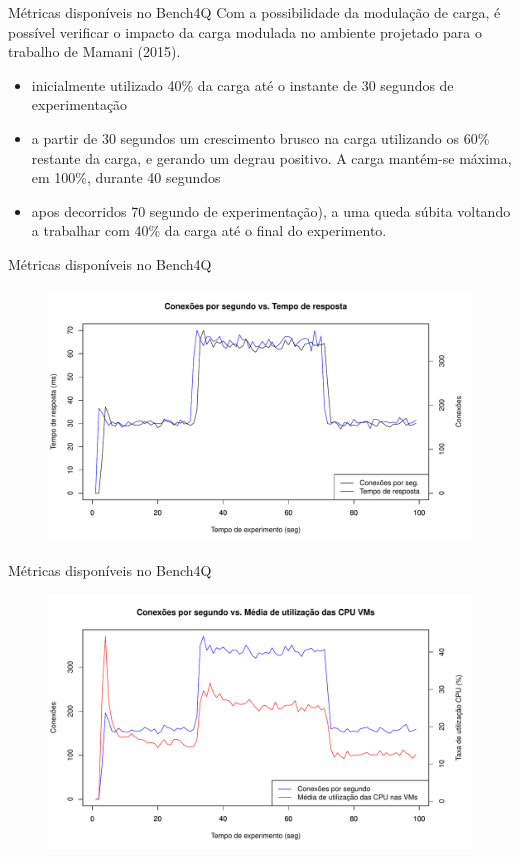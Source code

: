 \begin{frame}{Métricas disponíveis no Bench4Q}
Com a possibilidade da modulação de carga, é possível verificar o impacto da carga modulada no ambiente projetado para o trabalho de Mamani (2015). 
	\begin{itemize}
		\item inicialmente utilizado 40\% da carga até o instante de 30 segundos de experimentação
	
		\item a partir de 30 segundos um crescimento brusco na carga utilizando os 60\% restante da carga, e gerando um degrau positivo. A carga mantém-se máxima, em 100\%, durante 40 segundos 
	
		\item apos decorridos 70 segundo de experimentação), a uma queda súbita voltando a trabalhar com 40\% da carga até o final do experimento.
	\end{itemize}
\end{frame}

\begin{frame}{Métricas disponíveis no Bench4Q}
	\begin{figure}[htb]
		\centering
		\includegraphics[scale=0.5]{../monograph/images/cps-resp60.pdf}	
		\label{fig:cps-resp60}
	\end{figure}
\end{frame}

\begin{frame}{Métricas disponíveis no Bench4Q}
	\begin{figure}[htb]
		\centering
		\includegraphics[scale=0.5]{../monograph/images/cps-vmcpu60.pdf}
		\label{fig:cps-vmcpu60}
	\end{figure}
\end{frame}

